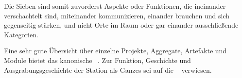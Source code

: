 \begin{newstuff}

    Die Sieben  sind somit zuvorderst Aspekte oder Funktionen, die ineinander verschachtelt sind, miteinander kommunizieren, einander brauchen und sich gegenseitig stärken, und nicht Orte im Raum oder gar einander ausschließende Kategorien.
    
    Eine sehr gute Übersicht über einzelne Projekte, Aggregate, Artefakte und Module bietet das kanonische ~\cite{cbasebook}. Zur Funktion, Geschichte und Ausgrabungsgeschichte der Station als Ganzes sei auf die ~\cite{cbasepressemap} verwiesen.
\end{newstuff}